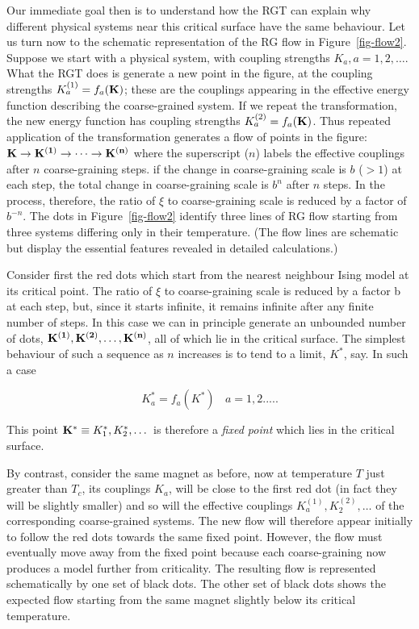 \documentclass[
  letterpaper,
  enabledeprecatedfontcommands]{report}
\begin{document}
\begin{tcolorbox}
Our immediate goal then is to understand how the RGT can explain why
different physical systems near this critical surface have the same
behaviour. Let us turn now to the schematic representation of the RG
flow in Figure~\ref{fig-flow2}. Suppose we start with a physical system,
with coupling strengths \(K_a,  a= 1,2, \dots\). What the RGT does is
generate a new point in the figure, at the coupling strengths
\(K_a^{(1)}=f_a({\bf K})\); these are the couplings appearing in the
effective energy function describing the coarse-grained system. If we
repeat the transformation, the new energy function has coupling
strengths \(K_a^{(2)}=f_a({\bf K})\). Thus repeated application of the
transformation generates a flow of points in the figure: \({\bf K\to
K^{(1)}\to\dots\to K^{(n)}}\) where the superscript (\(n\)) labels the
effective couplings after \(n\) coarse-graining steps. if the change in
coarse-graining scale is \(b\) (\(> 1\)) at each step, the total change
in coarse-graining scale is \(b^n\) after \(n\) steps. In the process,
therefore, the ratio of \(\xi\) to coarse-graining scale is reduced by a
factor of \(b^{-n}\). The dots in Figure~\ref{fig-flow2} identify three
lines of RG flow starting from three systems differing only in their
temperature. (The flow lines are schematic but display the essential
features revealed in detailed calculations.)

Consider first the red dots which start from the nearest neighbour Ising
model at its critical point. The ratio of \(\xi\) to coarse-graining
scale is reduced by a factor b at each step, but, since it starts
infinite, it remains infinite after any finite number of steps. In this
case we can in principle generate an unbounded number of dots,
\({\bf K^{(1)}, K^{(2)},\dots,K^{(n)}}\), all of which lie in the
critical surface. The simplest behaviour of such a sequence as \(n\)
increases is to tend to a limit, \(K^*\), say. In such a case

\[K^*_a=f_a(K^*)~~~~ a= 1,2 .....\]

This point \({\bf K^*} \equiv K_1^*, K_2^*, \dots\) is therefore a
\emph{fixed point} which lies in the critical surface.

By contrast, consider the same magnet as before, now at temperature
\(T\) just greater than \(T_c\), its couplings \(K_a\), will be close to
the first red dot (in fact they will be slightly smaller) and so will
the effective couplings \(K_a^{(1)},K_2^{(2)},\dots\) of the
corresponding coarse-grained systems. The new flow will therefore appear
initially to follow the red dots towards the same fixed point. However,
the flow must eventually move away from the fixed point because each
coarse-graining now produces a model further from criticality. The
resulting flow is represented schematically by one set of black dots.
The other set of black dots shows the expected flow starting from the
same magnet slightly below its critical temperature.


\end{tcolorbox}
\end{document}
